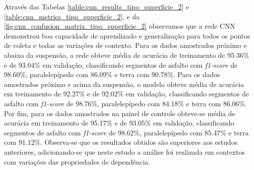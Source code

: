 Através das Tabelas \ref{table:cnn_results_tipo_superficie_2} e \ref{table:cnn_metrics_tipo_superficie_2}, e da \autoref{fig:cnn_confusion_matrix_tipo_superficie_2} observamos que a rede CNN demonstrou boa capacidade de aprendizado e generalização para todos os pontos de coleta e todas as variações de contexto. Para os dados amostrados próximo e abaixo da suspensão, a rede obteve média de acurácia de treinamento de 95.36\% e de 93.04\% em validação, classificando segmentos de asfalto com \textit{f1-score} de 98.60\%, paralelepípedo com 86.09\% e terra com 90.78\%. Para os dados amostrados próximo e acima da suspensão, o modelo obteve média de acurácia em treinamento de 92.27\% e de 92.02\% em validação, classificando segmentos de asfalto com \textit{f1-score} de 98.76\%, paralelepípedo com 84.18\% e terra com 86.06\%. Por fim, para os dados amostrados na painel de controle obteve-se média de acurácia em treinamento de 95.17\% e de 93.05\% em validação, classificando segmentos de asfalto com \textit{f1-score} de 98.62\%, paralelepípedo com 85.47\% e terra com 91.12\%. Observa-se que os resultados obtidos são superiores aos estudos anteriores, adicionando-se que neste estudo a análise foi realizada em contextos com variações das propriedades de dependência.